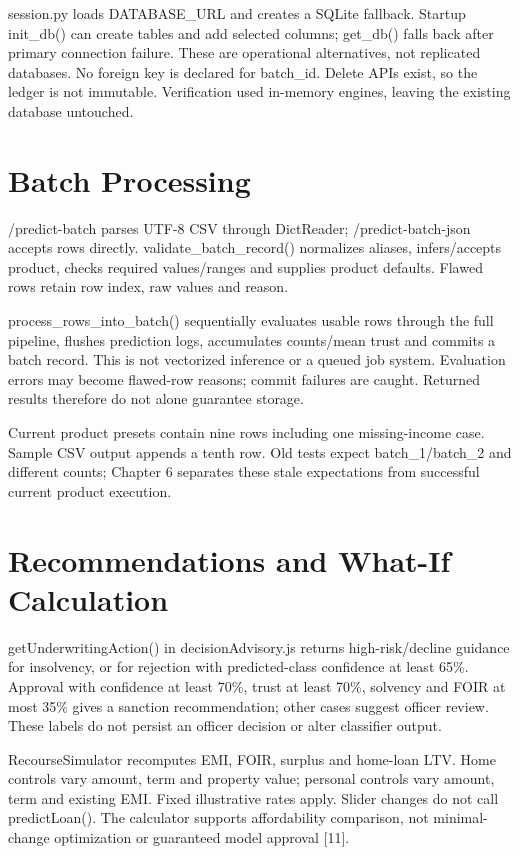 \documentclass[12pt,a4paper]{report}
\begin{document}
session.py loads DATABASE\_URL and creates a SQLite fallback. Startup init\_db() can create tables and add selected columns; get\_db() falls back after primary connection failure. These are operational alternatives, not replicated databases. No foreign key is declared for batch\_id. Delete APIs exist, so the ledger is not immutable. Verification used in-memory engines, leaving the existing database untouched.

\section{Batch Processing}
/predict-batch parses UTF-8 CSV through DictReader; /predict-batch-json accepts rows directly. validate\_batch\_record() normalizes aliases, infers/accepts product, checks required values/ranges and supplies product defaults. Flawed rows retain row index, raw values and reason.

process\_rows\_into\_batch() sequentially evaluates usable rows through the full pipeline, flushes prediction logs, accumulates counts/mean trust and commits a batch record. This is not vectorized inference or a queued job system. Evaluation errors may become flawed-row reasons; commit failures are caught. Returned results therefore do not alone guarantee storage.

Current product presets contain nine rows including one missing-income case. Sample CSV output appends a tenth row. Old tests expect batch\_1/batch\_2 and different counts; Chapter 6 separates these stale expectations from successful current product execution.

\section{Recommendations and What-If Calculation}
getUnderwritingAction() in decisionAdvisory.js returns high-risk/decline guidance for insolvency, or for rejection with predicted-class confidence at least 65\%. Approval with confidence at least 70\%, trust at least 70\%, solvency and FOIR at most 35\% gives a sanction recommendation; other cases suggest officer review. These labels do not persist an officer decision or alter classifier output.

RecourseSimulator recomputes EMI, FOIR, surplus and home-loan LTV. Home controls vary amount, term and property value; personal controls vary amount, term and existing EMI. Fixed illustrative rates apply. Slider changes do not call predictLoan(). The calculator supports affordability comparison, not minimal-change optimization or guaranteed model approval [11].
\end{document}
